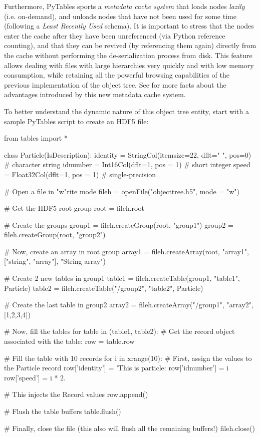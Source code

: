 Furthermore, PyTables sports a \emph{metadata
cache system} that loads nodes \emph{lazily}
(i.e. on-demand), and unloads nodes that have not been used for some
time (following a \emph{Least Recently Used} schema). It
is important to stress that the nodes enter the cache after they
have been unreferenced (via Python reference counting),
and that they can be revived (by referencing them again) directly from
the cache without performing the de-serialization process from
disk. This feature allows dealing with files with large hierarchies
very quickly and with low memory consumption, while retaining all the
powerful browsing capabilities of the previous implementation of the
object tree. See \cite{Alted2005} for
more facts about the advantages introduced by this new metadata cache
system.

To better understand the dynamic nature of this object tree
entity, start with a sample PyTables script to create an HDF5
file:

\vspace{2.5mm}
\begin{python}
from tables import *

class Particle(IsDescription):
    identity = StringCol(itemsize=22, dflt=" ", pos=0)  # character string
    idnumber = Int16Col(dflt=1, pos = 1)  # short integer
    speed    = Float32Col(dflt=1, pos = 1)  # single-precision

# Open a file in "w"rite mode
fileh = openFile("objecttree.h5", mode = "w")

# Get the HDF5 root group
root = fileh.root

# Create the groups
group1 = fileh.createGroup(root, "group1")
group2 = fileh.createGroup(root, "group2")

# Now, create an array in root group
array1 = fileh.createArray(root, "array1", ["string", "array"], "String array")

# Create 2 new tables in group1
table1 = fileh.createTable(group1, "table1", Particle)
table2 = fileh.createTable("/group2", "table2", Particle)

# Create the last table in group2
array2 = fileh.createArray("/group1", "array2", [1,2,3,4])

# Now, fill the tables
for table in (table1, table2):
    # Get the record object associated with the table:
    row = table.row

    # Fill the table with 10 records
    for i in xrange(10):
        # First, assign the values to the Particle record
        row['identity']  = 'This is particle: %
        row['idnumber'] = i
        row['speed']  = i * 2.

        # This injects the Record values
        row.append()

    # Flush the table buffers
    table.flush()

# Finally, close the file (this also will flush all the remaining buffers!)
fileh.close()
\end{python}
\vspace{2.5mm}


